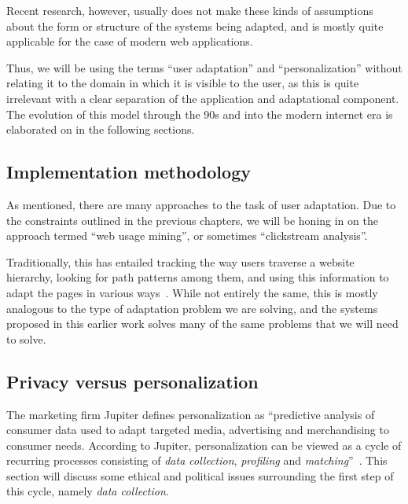 Recent research, however, usually does not make these kinds of assumptions about the form or structure of the systems being adapted, and is mostly quite applicable for the case of modern web applications.

Thus, we will be using the terms ``user adaptation'' and ``personalization'' without relating it to the domain in which it is visible to the user, as this is quite irrelevant with a clear separation of the application and adaptational component. The evolution of this model through the 90s and into the modern internet era is elaborated on in the following sections.

\subsection{Implementation methodology}

As mentioned, there are many approaches to the task of user adaptation. Due to the constraints outlined in the previous chapters, we will be honing in on the approach termed ``web usage mining'', or sometimes ``clickstream analysis''.

Traditionally, this has entailed tracking the way users traverse a website hierarchy, looking for path patterns among them, and using this information to adapt the pages in various ways~\cite{Mobasher2000,Eirinaki2003,Montgomery2009}. While not entirely the same, this is mostly analogous to the type of adaptation problem we are solving, and the systems proposed in this earlier work solves many of the same problems that we will need to solve.

%
%

\subsection{Privacy versus personalization}
\label{survey:sec:privacy_vs_personalization}

The marketing firm Jupiter defines personalization as ``predictive analysis of consumer data used to adapt targeted media, advertising and merchandising to consumer needs. According to Jupiter, personalization can be viewed as a cycle of recurring processes consisting of \emph{data collection}, \emph{profiling} and \emph{matching}''~\cite{Foster2000}. This section will discuss some ethical and political issues surrounding the first step of this cycle, namely \emph{data collection}.

